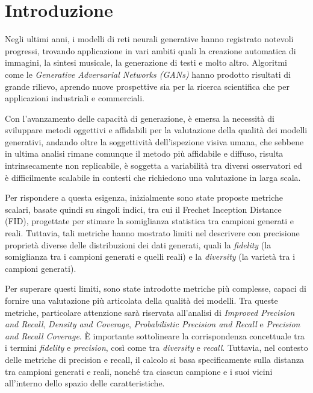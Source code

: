 \chapter{Introduzione}\label{ch:introduzione}

Negli ultimi anni, i modelli di reti neurali generative hanno registrato notevoli progressi, trovando applicazione in vari
ambiti quali la creazione automatica di immagini, la sintesi musicale, la generazione di testi e molto altro. 
Algoritmi come le \textit{Generative Adversarial Networks (GANs)} hanno prodotto risultati di grande rilievo, aprendo nuove prospettive 
sia per la ricerca scientifica che per applicazioni industriali e commerciali.

Con l'avanzamento delle capacità di generazione, è emersa la necessità di sviluppare metodi oggettivi e affidabili per la valutazione della qualità dei modelli generativi,
andando oltre la soggettività dell’ispezione visiva umana, che sebbene in ultima analisi rimane comunque il metodo più affidabile e diffuso, 
risulta intrinsecamente non replicabile, è soggetta a variabilità tra diversi osservatori ed è difficilmente scalabile in contesti che richiedono una valutazione in larga scala.

Per rispondere a questa esigenza, inizialmente sono state proposte metriche scalari, basate quindi su singoli indici, tra cui il Frechet Inception Distance (FID), 
progettate per stimare la somiglianza statistica tra campioni generati e reali. 
Tuttavia, tali metriche hanno mostrato limiti nel descrivere con precisione proprietà diverse delle distribuzioni dei dati generati, quali la \textit{fidelity} 
(la somiglianza tra i campioni generati e quelli reali) e la \textit{diversity} (la varietà tra i campioni generati).

Per superare questi limiti, sono state introdotte metriche più complesse, capaci di fornire una valutazione più articolata della qualità dei modelli. 
Tra queste metriche, particolare attenzione sarà riservata all'analisi di \textit{Improved Precision and Recall}, \textit{Density and Coverage}, \textit{Probabilistic Precision and Recall} e \textit{Precision and Recall Coverage}. 
È importante sottolineare la corrispondenza concettuale tra i termini \textit{fidelity} e \textit{precision}, così come tra \textit{diversity} e \textit{recall}. 
Tuttavia, nel contesto delle metriche di precision e recall, il calcolo si basa specificamente sulla distanza tra campioni generati e reali, 
nonché tra ciascun campione e i suoi vicini all'interno dello spazio delle caratteristiche. 

